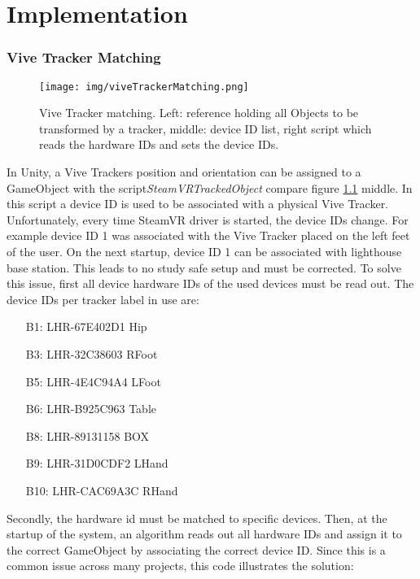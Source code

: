 \chapter{Implementation}

\subsection{Vive Tracker Matching}
\begin{figure}
	\centering
	\texttt{[image: img/viveTrackerMatching.png]}
	\caption{Vive Tracker matching. Left: reference holding all Objects to be transformed by a tracker, middle: device ID list, right script which reads the hardware IDs and sets the device IDs.}
	\label{fig:viveTrackerMatching}
\end{figure}
In Unity, a Vive Trackers position and orientation can be assigned to a GameObject with the script\textit{SteamVRTrackedObject} compare figure \ref{fig:viveTrackerMatching} middle. In this script a device ID is used to be associated with a physical Vive Tracker. Unfortunately, every time SteamVR driver is started, the device IDs change. For example device ID 1 was associated with the Vive Tracker placed on the left feet of the user. On the next startup, device ID 1 can be associated with lighthouse base station. This leads to no study safe setup and must be corrected. To solve this issue, first all device hardware IDs of the used devices must be read out. The device IDs per tracker label in use are:
\begin{itemize}
	\item[B1:] LHR-67E402D1 Hip
	\item[B3:] LHR-32C38603 RFoot
	\item[B5:] LHR-4E4C94A4 LFoot
	\item[B6:] LHR-B925C963 Table
	\item[B8:] LHR-89131158 BOX
	\item[B9:] LHR-31D0CDF2 LHand
	\item[B10:] LHR-CAC69A3C RHand
\end{itemize}
Secondly, the hardware id must be matched to specific devices. Then, at the startup of the system, an algorithm reads out all hardware IDs and assign it to the correct GameObject by associating the correct device ID. Since this is a common issue across many projects, this code illustrates the solution:

